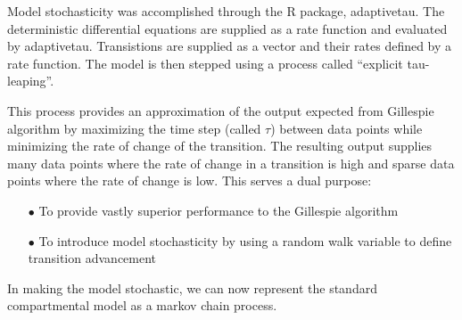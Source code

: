\documentclass[../Paper.tex]{subfiles}
\begin{document}
\justifying
Model stochasticity was accomplished through the R package, adaptivetau.
The deterministic differential equations are supplied as a rate function and evaluated
by adaptivetau. Transistions are supplied as a vector and their rates defined by
a rate function. The model is then stepped using a process called
``explicit tau-leaping''\cite{yang_gillespie_petzold_2007}.

This process provides an approximation of the output expected from Gillespie algorithm by maximizing
the time step (called $\tau$) between data points while minimizing the rate of change
of the transition. The resulting output supplies many data points where the rate of
change in a transition is high and sparse data points where the rate
of change is low. This serves a dual purpose:

\begin{enumerate}
  \item[$\bullet$]{To provide vastly superior performance to the Gillespie algorithm}
  \item[$\bullet$]{To introduce model stochasticity by using a random walk variable
                   to define transition advancement}
\end{enumerate}

In making the model stochastic, we can now represent the standard compartmental model
as a markov chain process.
\end{document}
